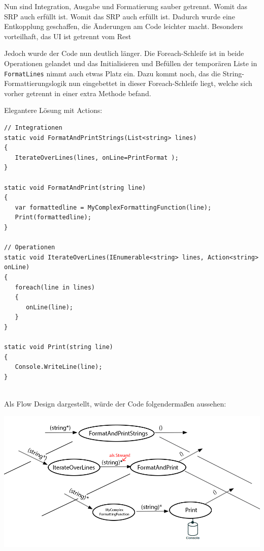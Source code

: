 Nun sind Integration, Ausgabe und Formatierung sauber getrennt. Womit das SRP
auch erfüllt ist. Womit das SRP auch erfüllt ist. Dadurch wurde eine Entkopplung geschaffen, 
die Änderungen am Code leichter macht. Besonders vorteilhaft, das UI ist getrennt vom Rest

Jedoch wurde der Code nun deutlich länger. Die Foreach-Schleife ist in beide Operationen gelandet und das Initialisieren und
Befüllen der temporären Liste in \texttt{FormatLines} nimmt auch etwas Platz ein.
Dazu kommt noch, das die String-Formattierungslogik nun eingebettet in dieser Foreach-Schleife liegt, welche sich vorher getrennt in
einer extra Methode  befand.

\bigskip

Elegantere Lösung mit Actions:

\begin{lstlisting}[caption=FormatAndPrintStrings Variante 2]
// Integrationen
static void FormatAndPrintStrings(List<string> lines)
{
   IterateOverLines(lines, onLine=PrintFormat );
}

static void FormatAndPrint(string line)
{
   var formattedline = MyComplexFormattingFunction(line);
   Print(formattedline);
}

// Operationen
static void IterateOverLines(IEnumerable<string> lines, Action<string> onLine)
{
   foreach(line in lines)
   {
      onLine(line);
   }
}

static void Print(string line)
{
   Console.WriteLine(line);
}


\end{lstlisting}

Als Flow Design dargestellt, würde der Code folgendermaßen aussehen:

\begin{center}
	\includegraphics[width=1\linewidth]{./img/FlowsForeach.png}
\end{center}


